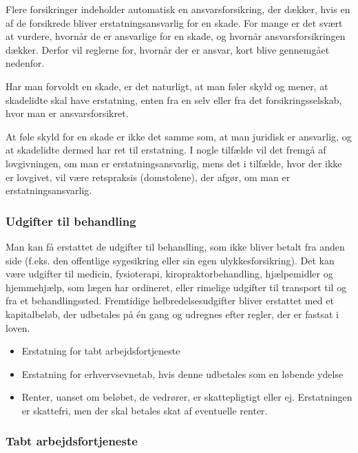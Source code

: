 \documentclass[]{book}
\providecommand{\tightlist}{%
  \setlength{\itemsep}{0pt}\setlength{\parskip}{0pt}}
\begin{document}
Flere forsikringer indeholder automatisk en ansvarsforsikring, der dækker, hvis en af de forsikrede bliver erstatningsansvarlig for en skade. For mange er det svært at vurdere, hvornår de er ansvarlige for en skade, og hvornår ansvarsforsikringen dækker. Derfor vil reglerne for, hvornår der er ansvar, kort blive gennemgået nedenfor.

Har man forvoldt en skade, er det naturligt, at man føler skyld og mener, at skadelidte skal have erstatning, enten fra en selv eller fra det forsikringsselskab, hvor man er ansvarsforsikret.

At føle skyld for en skade er ikke det samme som, at man juridisk er ansvarlig, og at skadelidte dermed har ret til erstatning. I nogle tilfælde vil det fremgå af lovgivningen, om man er erstatningsansvarlig, mens det i tilfælde, hvor der ikke er lovgivet, vil være retspraksis (domstolene), der afgør, om man er erstatningsansvarlig.

\hypertarget{udgifter-til-behandling}{%
\subsubsection{Udgifter til behandling}\label{udgifter-til-behandling}}

Man kan få erstattet de udgifter til behandling, som ikke bliver betalt fra anden side (f.eks. den offentlige sygesikring eller sin egen ulykkesforsikring). Det kan være udgifter til medicin, fysioterapi, kiropraktorbehandling, hjælpemidler og hjemmehjælp, som lægen har ordineret, eller rimelige udgifter til transport til og fra et behandlingssted.
Fremtidige helbredelsesudgifter bliver erstattet med et kapitalbeløb, der udbetales på én gang og udregnes efter regler, der er fastsat i loven.

\begin{itemize}
\tightlist
\item
  Erstatning for tabt arbejdsfortjeneste
\item
  Erstatning for erhvervsevnetab, hvis denne udbetales som en løbende ydelse
\item
  Renter, uanset om beløbet, de vedrører, er skattepligtigt eller ej. Erstatningen er skattefri, men der skal betales skat af eventuelle renter.
\end{itemize}

\hypertarget{tabt-arbejdsfortjeneste}{%
\subsubsection{Tabt arbejdsfortjeneste}\label{tabt-arbejdsfortjeneste}}
\end{document}
